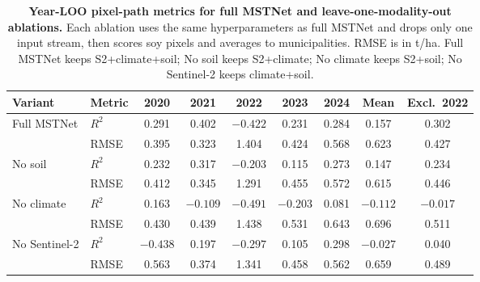 \begin{table}[!htbp]
\centering
\footnotesize
\setlength{\tabcolsep}{3.5pt}
\caption{\textbf{Year-LOO pixel-path metrics for full MSTNet and leave-one-modality-out ablations.}
Each ablation uses the same hyperparameters as full MSTNet and drops only one input stream, then scores soy pixels and averages to municipalities.
RMSE is in \si{t/ha}.
Full MSTNet keeps S2+climate+soil; No soil keeps S2+climate; No climate keeps S2+soil; No Sentinel-2 keeps climate+soil.}
\label{tab:ablations}
\begin{tabular}{@{}llccccccc@{}}
\toprule
Variant & Metric & 2020 & 2021 & 2022 & 2023 & 2024 & Mean & Excl.\ 2022 \\
\midrule
\multirow{2}{*}{Full MSTNet}
  & $R^2$ & 0.291 & 0.402 & $-0.422$ & 0.231 & 0.284 & 0.157 & 0.302 \\
  & RMSE & 0.395 & 0.323 & 1.404 & 0.424 & 0.568 & 0.623 & 0.427 \\
\midrule
\multirow{2}{*}{No soil}
  & $R^2$ & 0.232 & 0.317 & $-0.203$ & 0.115 & 0.273 & 0.147 & 0.234 \\
  & RMSE & 0.412 & 0.345 & 1.291 & 0.455 & 0.572 & 0.615 & 0.446 \\
\midrule
\multirow{2}{*}{No climate}
  & $R^2$ & 0.163 & $-0.109$ & $-0.491$ & $-0.203$ & 0.081 & $-0.112$ & $-0.017$ \\
  & RMSE & 0.430 & 0.439 & 1.438 & 0.531 & 0.643 & 0.696 & 0.511 \\
\midrule
\multirow{2}{*}{No Sentinel-2}
  & $R^2$ & $-0.438$ & 0.197 & $-0.297$ & 0.105 & 0.298 & $-0.027$ & 0.040 \\
  & RMSE & 0.563 & 0.374 & 1.341 & 0.458 & 0.562 & 0.659 & 0.489 \\
\bottomrule
\end{tabular}
\end{table}
